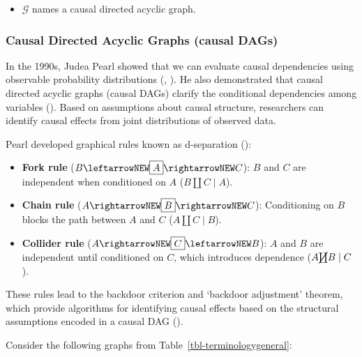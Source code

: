 \documentclass[
  single column]{article}
\providecommand{\tightlist}{%
  \setlength{\itemsep}{0pt}\setlength{\parskip}{0pt}}\usepackage{longtable,booktabs,array}
\begin{document}
\begin{itemize}
\tightlist
\item
  \textbf{\(\mathcal{G}\)} names a causal directed acyclic graph.
\end{itemize}

\subsubsection{Causal Directed Acyclic Graphs (causal
DAGs)}\label{causal-directed-acyclic-graphs-causal-dags}

In the 1990s, Judea Pearl showed that we can evaluate causal
dependencies using observable probability distributions
(, ).
He also demonstrated that causal directed acyclic graphs (causal DAGs)
clarify the conditional dependencies among variables
(). Based on assumptions about
causal structure, researchers can identify causal effects from joint
distributions of observed data.

Pearl developed graphical rules known as d-separation
():

\begin{itemize}
\tightlist
\item
  \textbf{Fork rule} (\(B \leftarrowNEW \boxed{A} \rightarrowNEW C\)):
  \(B\) and \(C\) are independent when conditioned on \(A\)
  (\(B \coprod C \mid A\)).
\item
  \textbf{Chain rule} (\(A \rightarrowNEW \boxed{B} \rightarrowNEW C\)):
  Conditioning on \(B\) blocks the path between \(A\) and \(C\)
  (\(A \coprod C \mid B\)).
\item
  \textbf{Collider rule}
  (\(A \rightarrowNEW \boxed{C} \leftarrowNEW B\)): \(A\) and \(B\) are
  independent until conditioned on \(C\), which introduces dependence
  (\(A \cancel{\coprod} B \mid C\)).
\end{itemize}

These rules lead to the backdoor criterion and `backdoor adjustment'
theorem, which provide algorithms for identifying causal effects based
on the structural assumptions encoded in a causal DAG
().

Consider the following graphs from Table~\ref{tbl-terminologygeneral}:
\end{document}
